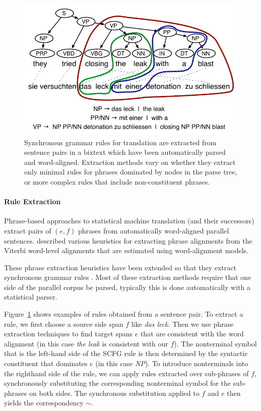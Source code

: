 \documentclass[11pt]{article}
\begin{document}
\begin{figure}[t]
\begin{center}
\includegraphics[width=0.9\linewidth]{figures/example_extraction-3.pdf}
\end{center}
\caption{Synchronous grammar rules for translation are extracted from
  sentence pairs in a bixtext which have been automatically parsed and
  word-aligned. Extraction methods vary on whether they extract only
  minimal rules for phrases dominated by nodes in the parse tree, or
  more complex rules that include non-constituent phrases.}
\label{example_extraction}
\end{figure}

\paragraph{Rule Extraction}

Phrase-based approaches to statistical machine translation (and their
successors) extract pairs of $(e, f)$ phrases from automatically
word-aligned parallel sentences. 
described various heuristics for extracting phrase alignments from the
Viterbi word-level alignments that are estimated using
 word-alignment models.

These phrase extraction heuristics have been extended so that they
extract synchronous grammar rules
\cite{Galley2004,Chiang2005,Zollmann2006,Liu2006}.  Most of these
extraction methods require that one side of the parallel corpus be
parsed, typically this is done automatically with a statistical
parser.

Figure~\ref{example_extraction} shows examples of rules obtained from
a sentence pair. To extract a rule, we first choose a source side span
$f$ like {\it das leck}.  Then we use phrase extraction techniques to
find target spans $e$ that are consistent with the word alignment (in
this case {\it the leak} is consistent with our $f$). The nonterminal
symbol that is the left-hand side of the SCFG rule is then determined
by the syntactic constituent that dominates $e$ (in this case {\it
  NP}). To introduce nonterminals into the righthand side of the rule,
we can apply rules extracted over sub-phrases of $f$, synchronously
substituting the corresponding nonterminal symbol for the sub-phrases
on both sides. The synchronous substitution applied to $f$ and $e$
then yields the correspondency $\sim$.
\end{document}
